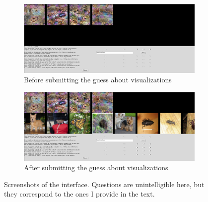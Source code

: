 \documentclass[12pt]{article}
\begin{document}
\begin{figure}[p]
  \centering

  \begin{subfigure}{\textwidth}
    \centering
    \includegraphics[width=\textwidth]{fig/interface1.png}
    \caption{Before submitting the guess about visualizations}
  \end{subfigure}
  
  \vspace{1em}

  \begin{subfigure}{\textwidth}
    \centering
    \includegraphics[width=\textwidth]{fig/interface2.png}
    \caption{After submitting the guess about visualizations}
  \end{subfigure}
  \caption{Screenshots of the interface. Questions are unintelligible here, but they correspond to the ones I provide in the text.}
  \label{fig:interface}
\end{figure}
\end{document}
